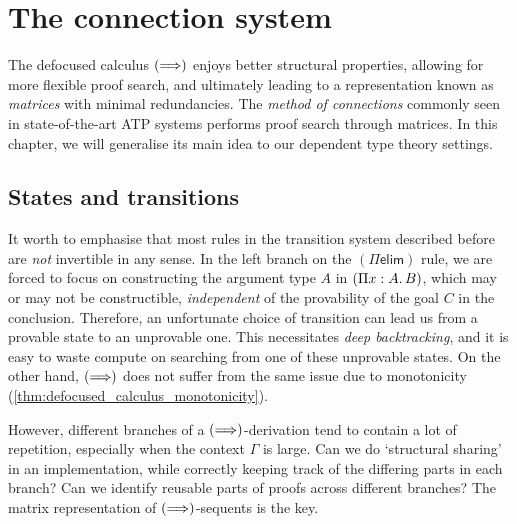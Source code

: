 \documentclass[twoside]{report}
\begin{document}

\chapter{The connection system}
\label{sec:the_connection_system}

The defocused calculus $(\Longrightarrow)$ enjoys better structural properties, allowing for more flexible proof search, and ultimately leading to a representation known as \emph{matrices} with minimal redundancies. The \emph{method of connections} commonly seen in state-of-the-art ATP systems performs proof search through matrices. In this chapter, we will generalise its main idea to our dependent type theory settings.

\section{States and transitions}
\label{sec:matrix_states_and_transitions}

It worth to emphasise that most rules in the transition system described before are \emph{not} invertible in any sense. In the left branch on the $(\Pi\mathsf{elim})$ rule, we are forced to focus on constructing the argument type $A$ in $(\Pi{x} : {A}.\,{B})$, which may or may not be constructible, \emph{independent} of the provability of the goal $C$ in the conclusion. Therefore, an unfortunate choice of transition can lead us from a provable state to an unprovable one. This necessitates \emph{deep backtracking}, and it is easy to waste compute on searching from one of these unprovable states. On the other hand, $(\Longrightarrow)$ does not suffer from the same issue due to monotonicity (\cref{thm:defocused_calculus_monotonicity}).

However, different branches of a $(\Longrightarrow)$-derivation tend to contain a lot of repetition, especially when the context $\Gamma$ is large. Can we do `structural sharing' in an implementation, while correctly keeping track of the differing parts in each branch? Can we identify reusable parts of proofs across different branches? The matrix representation of $(\Longrightarrow)$-sequents is the key.
\end{document}
